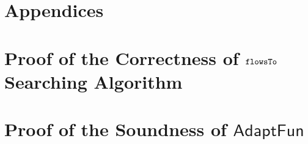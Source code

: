\documentclass[a4paper,11pt]{article}
\newcommand{\THESYSTEM}{\textsf{AdaptFun}}
\begin{document}
\clearpage
\appendix
{}
\section*{Appendices}
\clearpage
\section{Proof of the Correctness of $\mathtt{flowsTo}$ Searching Algorithm}

\clearpage
\section{Proof of the Soundness of $\THESYSTEM$}




\end{document}
